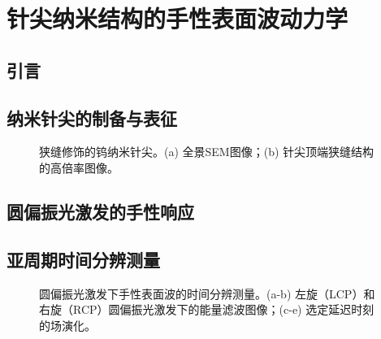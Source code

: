 \chapter{针尖纳米结构的手性表面波动力学}
\label{chap:result1}

\section{引言}
\label{sec:r1-intro}


\section{纳米针尖的制备与表征}
\label{sec:r1-fabrication}


\begin{figure}[htbp]
    \centering
    \caption{\label{fig:ch4-tip} 狭缝修饰的钨纳米针尖。(a) 全景SEM图像；(b) 针尖顶端狭缝结构的高倍率图像。}
\end{figure}

\section{圆偏振光激发的手性响应}
\label{sec:r1-chiral}


\section{亚周期时间分辨测量}
\label{sec:r1-temporal}


\begin{figure}[htbp]
    \centering
    \caption{\label{fig:ch4-chiral} 圆偏振光激发下手性表面波的时间分辨测量。(a-b) 左旋（LCP）和右旋（RCP）圆偏振光激发下的能量滤波图像；(c-e) 选定延迟时刻的场演化。}
\end{figure}

